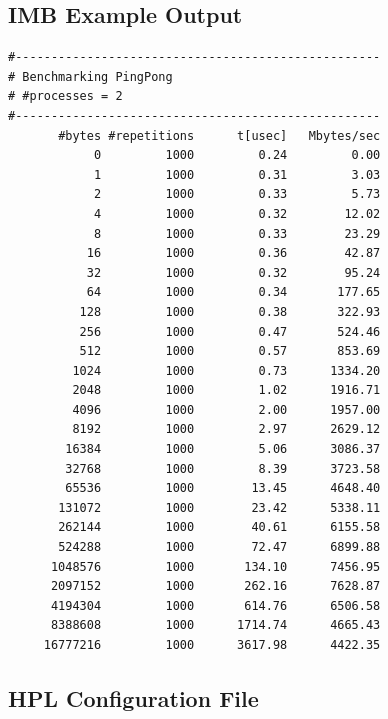 \documentclass{article}
\begin{document}
    \subsection{IMB Example Output}
        \label{appendix:imb-example-output}

        \begin{verbatim}
#---------------------------------------------------
# Benchmarking PingPong
# #processes = 2
#---------------------------------------------------
       #bytes #repetitions      t[usec]   Mbytes/sec
            0         1000         0.24         0.00
            1         1000         0.31         3.03
            2         1000         0.33         5.73
            4         1000         0.32        12.02
            8         1000         0.33        23.29
           16         1000         0.36        42.87
           32         1000         0.32        95.24
           64         1000         0.34       177.65
          128         1000         0.38       322.93
          256         1000         0.47       524.46
          512         1000         0.57       853.69
         1024         1000         0.73      1334.20
         2048         1000         1.02      1916.71
         4096         1000         2.00      1957.00
         8192         1000         2.97      2629.12
        16384         1000         5.06      3086.37
        32768         1000         8.39      3723.58
        65536         1000        13.45      4648.40
       131072         1000        23.42      5338.11
       262144         1000        40.61      6155.58
       524288         1000        72.47      6899.88
      1048576         1000       134.10      7456.95
      2097152         1000       262.16      7628.87
      4194304         1000       614.76      6506.58
      8388608         1000      1714.74      4665.43
     16777216         1000      3617.98      4422.35
        \end{verbatim}

    \subsection{HPL Configuration File}
        \label{appendix:hpl-conf}
\end{document}

